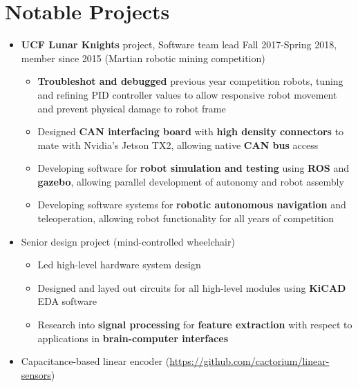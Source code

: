 \documentclass{my_resume}
\begin{document}
\section{Notable Projects}
\begin{itemize}[noitemsep]
    \item \textbf{UCF Lunar Knights} project, Software team lead Fall 2017-Spring 2018, member since 2015 (Martian robotic mining competition)
        \begin{itemize}[noitemsep]
          \item \textbf{Troubleshot and debugged} previous year competition robots, tuning and refining PID controller values to allow responsive robot movement and prevent physical damage to robot frame
          \item Designed \textbf{CAN interfacing board} with \textbf{high density connectors} to mate with Nvidia's Jetson TX2, allowing native \textbf{CAN bus} access
          \item Developing software for \textbf{robot simulation and testing} using \textbf{ROS} and \textbf{gazebo}, allowing parallel development of autonomy and robot assembly
          \item Developing software systems for \textbf{robotic autonomous navigation} and teleoperation, allowing robot functionality for all years of competition
        \end{itemize}
      \item Senior design project (mind-controlled wheelchair)
        \begin{itemize}[noitemsep]
            \item Led high-level hardware system design
            \item Designed and layed out circuits for all high-level modules using \textbf{KiCAD} EDA software
            \item Research into \textbf{signal processing} for \textbf{feature extraction} with respect to applications in \textbf{brain-computer interfaces}
        \end{itemize}
      \item Capacitance-based linear encoder (\url{https://github.com/cactorium/linear-sensors})
        \begin{itemize}[noitemsep]

\end{itemize}
\end{itemize}
\end{document}
